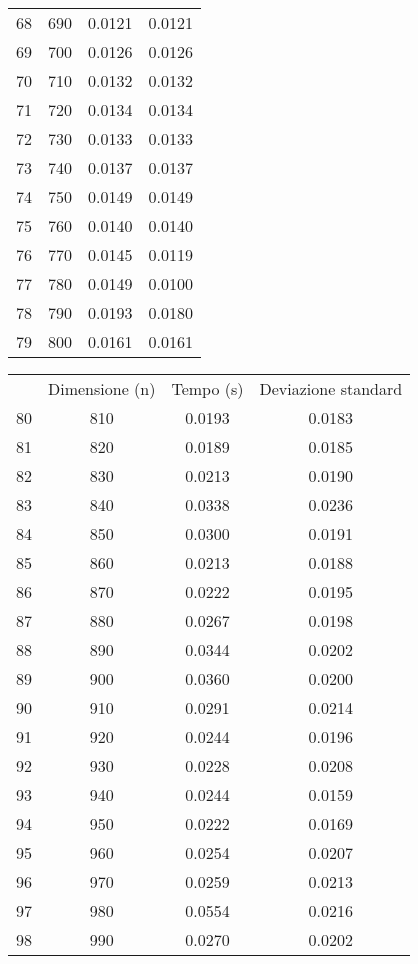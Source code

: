 \begin{table}
\begin{adjustbox}{width=1\textwidth/2}
\begin{tabular}{|c|c|c|c|}
68 & 690 & 0.0121 & 0.0121 \\
\cline{1-4}
69 & 700 & 0.0126 & 0.0126 \\
\cline{1-4}
70 & 710 & 0.0132 & 0.0132 \\
\cline{1-4}
71 & 720 & 0.0134 & 0.0134 \\
\cline{1-4}
72 & 730 & 0.0133 & 0.0133 \\
\cline{1-4}
73 & 740 & 0.0137 & 0.0137 \\
\cline{1-4}
74 & 750 & 0.0149 & 0.0149 \\
\cline{1-4}
75 & 760 & 0.0140 & 0.0140 \\
\cline{1-4}
76 & 770 & 0.0145 & 0.0119 \\
\cline{1-4}
77 & 780 & 0.0149 & 0.0100 \\
\cline{1-4}
78 & 790 & 0.0193 & 0.0180 \\
\cline{1-4}
79 & 800 & 0.0161 & 0.0161 \\
\cline{1-4}
\end{tabular}
\end{adjustbox}
\end{table}

\begin{table}
\centering
\begin{adjustbox}{width=1\textwidth/2}
\begin{tabular}{|c|c|c|c|}
\hline
 & Dimensione (n) & Tempo (s) & Deviazione standard \\
80 & 810 & 0.0193 & 0.0183 \\
\cline{1-4}
81 & 820 & 0.0189 & 0.0185 \\
\cline{1-4}
82 & 830 & 0.0213 & 0.0190 \\
\cline{1-4}
83 & 840 & 0.0338 & 0.0236 \\
\cline{1-4}
84 & 850 & 0.0300 & 0.0191 \\
\cline{1-4}
85 & 860 & 0.0213 & 0.0188 \\
\cline{1-4}
86 & 870 & 0.0222 & 0.0195 \\
\cline{1-4}
87 & 880 & 0.0267 & 0.0198 \\
\cline{1-4}
88 & 890 & 0.0344 & 0.0202 \\
\cline{1-4}
89 & 900 & 0.0360 & 0.0200 \\
\cline{1-4}
90 & 910 & 0.0291 & 0.0214 \\
\cline{1-4}
91 & 920 & 0.0244 & 0.0196 \\
\cline{1-4}
92 & 930 & 0.0228 & 0.0208 \\
\cline{1-4}
93 & 940 & 0.0244 & 0.0159 \\
\cline{1-4}
94 & 950 & 0.0222 & 0.0169 \\
\cline{1-4}
95 & 960 & 0.0254 & 0.0207 \\
\cline{1-4}
96 & 970 & 0.0259 & 0.0213 \\
\cline{1-4}
97 & 980 & 0.0554 & 0.0216 \\
\cline{1-4}
98 & 990 & 0.0270 & 0.0202 \\
\cline{1-4}
\end{tabular}
\end{adjustbox}
\end{table}

